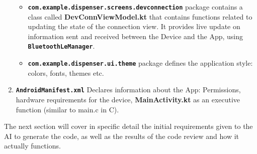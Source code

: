 \begin{enumerate}
\begin{itemize}
		\item \texttt{\textbf{com.example.dispenser.screens.devconnection}} package contains a class called \textbf{DevConnViewModel.kt} that contains functions related to updating the state of the connection view. It provides live update on information sent and received between the Device and the App, using \texttt{\textbf{\mbox{BluetoothLeManager}}}. 
		
		\item \texttt{\textbf{com.example.dispenser.ui.theme}} package defines the application style: colors, fonts, themes etc.
	\end{itemize}
	\item \texttt{\textbf{AndroidManifest.xml}} Declares information about the App: Permissions,  hardware requirements for the device, \textbf{MainActivity.kt} as an executive function (similar to main.c in C).
\end{enumerate}

The next section will cover in specific detail the initial requirements given to the AI to generate the code, as well as the results of the code review and how it actually functions.
